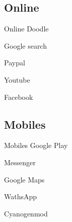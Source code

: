\documentclass{beamer}
\begin{document}
\subsection{Online}
\begin{frame}{Online}
\noindent\vspace{0.1in}\hspace{2.2in} Doodle \par
\noindent\vspace{0.1in}\hspace{0.4in} Google search \par
\noindent\vspace{0.1in}\hspace{1.9in} Paypal \par
\noindent\vspace{0.1in}\hspace{3.1in} Youtube \par 		%
\noindent\vspace{0.1in}\hspace{0.5in} Facebook \par
\end{frame}

\subsection{Mobiles}
\begin{frame}{Mobiles}
\noindent\vspace{0.1in}\hspace{1.2in} Google Play \par
\noindent\vspace{0.1in}\hspace{2.8in} Messenger \par
\noindent\vspace{0.1in}\hspace{1.5in} Google Maps \par
\noindent\vspace{0.1in}\hspace{0.4in} WathsApp \par
\noindent\vspace{0.1in}\hspace{2.2in} Cyanogenmod \par
\end{frame}
\end{document}

